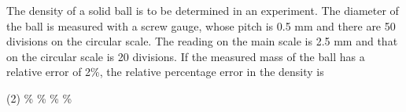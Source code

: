 
\item The density of a solid ball is to be determined in an experiment. The diameter of the ball is measured with a screw gauge, whose pitch is 0.5 mm and there are 50 divisions on the circular scale. The reading on the main scale is 2.5 mm and that on the circular scale is 20 divisions. If the measured mass of the ball has a relative error of 2\%, the relative percentage error in the density is
    \begin{tasks}(2)
        \%
        \%
        \%
        \%
    \end{tasks}
